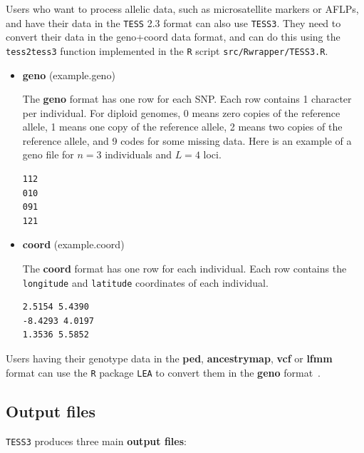 \documentclass[10pt,a4paper]{article}
\begin{document}
Users who want to process allelic data, such as microsatellite markers or AFLPs, and have their data in the {\tt TESS} 2.3 format can also use {\tt TESS3}. They need to convert their data in the geno+coord data format, and can do this using the {\tt tess2tess3} function implemented in the {\tt R} script {\tt src/Rwrapper/TESS3.R}.




\begin{itemize}
\item {\bf geno} (example.geno)

The {\bf geno} format has one row for each SNP. Each row contains 1 character per individual. For diploid genomes,  0 means zero copies of the reference allele, 1 means one copy of the reference allele, 2 means two copies of the reference allele, and 9 codes for some missing data. Here is an example of a geno file for $n=3$ individuals and $L=4$ loci.
\\
\begin{center}
\footnotesize
\begin{Verbatim}[frame=single]
112
010
091
121
\end{Verbatim}
\end{center}


\item {\bf coord} (example.coord)

The {\bf coord} format has one row for each individual. Each row contains the \verb|longitude| and \verb|latitude| coordinates of each individual.
\\
\begin{center}
\footnotesize
\begin{Verbatim}[frame=single]
2.5154 5.4390
-8.4293 4.0197
1.3536 5.5852
\end{Verbatim}
\end{center}

\end{itemize}

\noindent Users having their genotype data in the {\bf ped}, {\bf ancestrymap}, {\bf vcf} or {\bf lfmm} format  can use the {\tt R} package {\tt LEA} to convert them in the {\bf geno} format~\cite{frichot2015lea}. 

\subsection{Output files}

{\tt TESS3} produces three main {\bf output files}:
\end{document}
